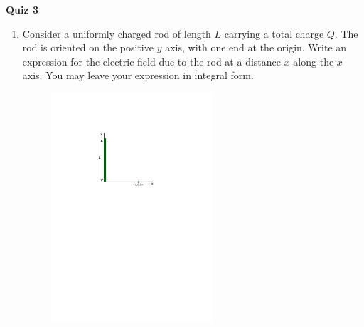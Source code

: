 \documentclass{article}
\begin{document}
\fancyfoot[C]{\thepage}
\vspace*{0cm}
\begin{center}
	{\LARGE \textbf{Quiz 3}}
\end{center}

\begin{enumerate}
	\item Consider a uniformly charged rod of length $L$ carrying a total charge $Q$. The rod is oriented on the positive $y$ axis, with one end at the origin. Write an expression for the electric field due to the rod at a distance $x$ along the $x$ axis. You may leave your expression in integral form.
	
	\begin{figure}[ht!]
		\centering
		\includegraphics[width=6cm]{charged_rod.pdf}
	\end{figure}
\end{enumerate}
\end{document}

